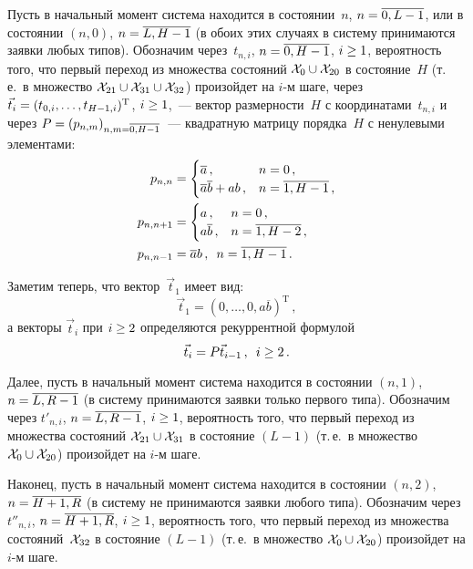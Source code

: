 \begin{multicols}{2}
Пусть в начальный момент система находится в
состоянии~$n$, ${n\hm=\overline{0,L-1}}$, или
в состоянии $(n,0)$, ${n\hm=\overline{L,H-1}}$ (в обоих
этих случаях в систему принимаются заявки любых типов).
Обозначим через~$t_{n,i}$, $n\hm=\overline{0,H-1}$, $i\hm\ge1$,
вероятность того, что первый переход из множества
состояний ${{\cal X}_0\cup{\cal X}_{20}}$ в состояние~$H$ (т.\,е.\ в множество
${{\cal X}_{21}\cup{\cal X}_{31}\cup{\cal X}_{32}}$)
произойдет на $i$-м шаге, через ${\vec t_i\hm= (t_{0,i},\ldots,t_{H-1,i})^{\mathrm{T}}}$,
${i\hm\ge1}$,~--- вектор размерности~$H$ с координатами~$t_{n,i}$
и через $P\hm=(p_{n,m})_{n,m=\overline{0,H-1}}$~---
квадратную матрицу порядка~$H$ с ненулевыми элементами:
\begin{align*}
p_{n,n} &=
\begin{cases}
\overline{a}\,,            &n=0\,,             \\
\overline{a}\overline{b} + a b\,,    &n=\overline{1,H-1}\,,
\end{cases}
\\
p_{n,n+1}
&= \begin{cases}
a\,,             &n=0\,,             \\
a\overline{b}\,,           &n=\overline{1,H-2}\,,
\end{cases}
\\
p_{n,n-1} &= \overline{a} b\,,\enskip       n=\overline{1,H-1}\,.
\end{align*}

Заметим теперь, что вектор~$\vec t_1$ имеет вид:
\begin{equation}
\label{5.1.4}
\vec t_1 = (0,\ldots,0,a\overline{b})^{\mathrm{T}}\,,
\end{equation}
а векторы $\vec t_i$ при $i\hm\ge 2$ определяются рекуррентной формулой
\begin{equation}
\label{5.1.5}
\vec t_i = P \vec t_{i-1}\,,  \enskip i\ge 2\,.
\end{equation}

Далее, пусть в начальный момент система находится в
состоянии $(n,1)$, ${n\hm=\overline{L,R-1}}$ (в систему
принимаются заявки только первого типа).
Обозначим через $t'_{n,i}$, $n\hm=\overline{L,R-1}$, ${i\hm\ge1}$,
вероятность того, что первый переход из множества
состояний ${{\cal X}_{21}\cup{\cal X}_{31}}$
в состояние $(L-1)$ (т.\,е.\ в множество ${{\cal X}_0\cup{\cal X}_{20}}$)
произойдет на $i$-м шаге.

Наконец, пусть в начальный момент система находится
в состоянии $(n,2)$,\ $n\hm=\overline{H+1,R}$ (в систему
не принимаются заявки любого типа).
Обозначим через
$t''_{n,i}$, $n\hm=\overline{H+1,R}$, $i\hm\ge1$,
вероятность того, что первый переход из множества
состояний~${{\cal X}_{32}}$ в состояние $(L-1)$ (т.\,е.\ в множество
${{\cal X}_0\cup{\cal X}_{20}}$) произойдет на $i$-м шаге.


\end{multicols}
